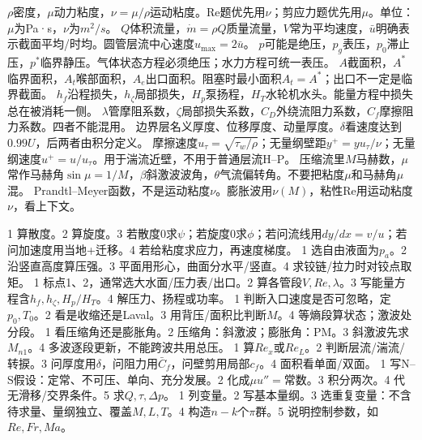 \sect{$\rho,\mu,\nu$}
$\rho$密度，$\mu$动力粘度，$\nu=\mu/\rho$运动粘度。Re题优先用$\nu$；剪应力题优先用$\mu$。单位：$\mu$为Pa·s，$\nu$为$m^2/s$。
$Q$体积流量，$\dot m=\rho Q$质量流量，$V$常为平均速度，$\bar u$明确表示截面平均/时均。圆管层流中心速度$u_{\max}=2\bar u$。
$p$可能是绝压，$p_g$表压，$p_0$滞止压，$p^*$临界静压。气体状态方程必须绝压；水力方程可统一表压。
$A$截面积，$A^*$临界面积，$A_t$喉部面积，$A_e$出口面积。阻塞时最小面积$A_t=A^*$；出口不一定是临界截面。
$h_f$沿程损失，$h_\zeta$局部损失，$H_p$泵扬程，$H_T$水轮机水头。能量方程中损失总在被消耗一侧。
$\lambda$管摩阻系数，$\zeta$局部损失系数，$C_D$外绕流阻力系数，$C_f$摩擦阻力系数。四者不能混用。
\sect{$\delta,\delta^*,\theta$}
边界层名义厚度、位移厚度、动量厚度。$\delta$看速度达到$0.99U$，后两者由积分定义。
摩擦速度$u_\tau=\sqrt{\tau_w/\rho}$；无量纲壁距$y^+=yu_\tau/\nu$；无量纲速度$u^+=u/u_\tau$。用于湍流近壁，不用于普通层流H--P。
压缩流里$M$马赫数，$\mu$常作马赫角$\sin\mu=1/M$，$\beta$斜激波波角，$\theta$气流偏转角。不要把粘度$\mu$和马赫角$\mu$混。
Prandtl--Meyer函数，不是运动粘度$\nu$。膨胀波用$\nu(M)$，粘性Re用运动粘度$\nu$，看上下文。

1 算散度。2 算旋度。3 若散度0求$\psi$；若旋度0求$\phi$；若问流线用$dy/dx=v/u$；若问加速度用当地+迁移。4 若给粘度求应力，再速度梯度。
1 选自由液面为$p_a$。2 沿竖直高度算压强。3 平面用形心，曲面分水平/竖直。4 求铰链/拉力时对铰点取矩。
1 标点1、2，通常选大水面/压力表/出口。2 算各管段$V,Re,\lambda$。3 写能量方程含$h_f,h_\zeta,H_p/H_T$。4 解压力、扬程或功率。
1 判断入口速度是否可忽略，定$p_0,T_0$。2 看是收缩还是Laval。3 用背压/面积比判断$M$。4 等熵段算状态；激波处分段。
1 看压缩角还是膨胀角。2 压缩角：斜激波；膨胀角：PM。3 斜激波先求$M_{n1}$。4 多波逐段更新，不能跨波共用总压。
1 算$Re_x$或$Re_L$。2 判断层流/湍流/转捩。3 问厚度用$\delta$，问阻力用$\bar C_f$，问壁剪用局部$c_f$。4 面积看单面/双面。
1 写N--S假设：定常、不可压、单向、充分发展。2 化成$\mu u''=$常数。3 积分两次。4 代无滑移/交界条件。5 求$Q,\tau,\Delta p$。
1 列变量。2 写基本量纲。3 选重复变量：不含待求量、量纲独立、覆盖$M,L,T$。4 构造$n-k$个$\pi$群。5 说明控制参数，如$Re,Fr,Ma$。

